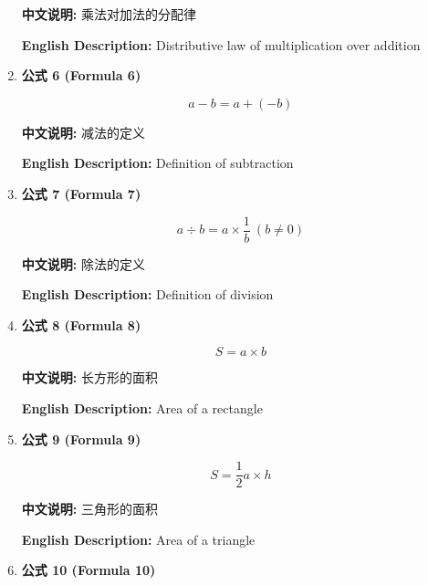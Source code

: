 \documentclass[12pt,a4paper]{article}
\begin{document}
\begin{enumerate}[leftmargin=*]
\textbf{中文说明:} 乘法对加法的分配律

\textbf{English Description:} Distributive law of multiplication over addition

\vspace{0.5cm}

\item \textbf{公式 6 (Formula 6)}

\begin{equation}
a - b = a + (-b)
\end{equation}

\textbf{中文说明:} 减法的定义

\textbf{English Description:} Definition of subtraction

\vspace{0.5cm}

\item \textbf{公式 7 (Formula 7)}

\begin{equation}
a \div b = a \times \frac{1}{b}\ (b \neq 0)
\end{equation}

\textbf{中文说明:} 除法的定义

\textbf{English Description:} Definition of division

\vspace{0.5cm}

\item \textbf{公式 8 (Formula 8)}

\begin{equation}
S = a \times b
\end{equation}

\textbf{中文说明:} 长方形的面积

\textbf{English Description:} Area of a rectangle

\vspace{0.5cm}

\item \textbf{公式 9 (Formula 9)}

\begin{equation}
S = \frac{1}{2} a \times h
\end{equation}

\textbf{中文说明:} 三角形的面积

\textbf{English Description:} Area of a triangle

\vspace{0.5cm}

\item \textbf{公式 10 (Formula 10)}


\end{enumerate}
\end{document}
